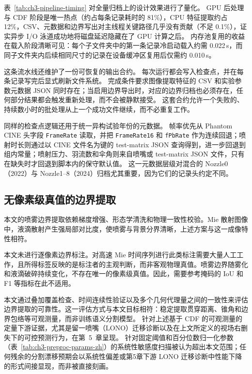 表~\ref{tab:ch3-pipeline-timing} 对全量归档上的设计效果进行了量化。
GPU 后处理与 CDF 阶段是唯一热点（约占每条记录耗时的 81\%），CPU 特征提取约占 12\%，CSV、元数据和边界写出对主线程关键路径几乎没有贡献（不足 0.1\%），证实异步 I/O 泳道成功地将磁盘延迟隐藏在了 GPU 计算之后。
内存池复用的收益在载入阶段清晰可见：每个子文件夹中的第一条记录冷启动载入约需 0.022\,s，而同子文件夹内后续相同尺寸的记录在设备缓冲区复用后仅需约 0.010\,s。

这条流水线还维护了一份可恢复的输出合约。
每次运行都会写入检查点，并在每条记录写完后显式刷新文件系统。
完成条件要求图像提取特征的 CSV 和实验参数元数据 JSON 同时存在；当启用边界导出时，对应的边界归档也必须存在，任何部分结果都会触发重新处理，而不会被静默接受。
这套合约允许一个失败的、持续数小时的批处理从上一个成功文件继续，而不必重复工作。

同样的检查点逻辑还用于统一异构试验年份的元数据。
帧率优先从 Phantom CINE 头字段 \texttt{FrameRate} 读取，并把 \texttt{FrameRate16} 和 \texttt{fPbRate} 作为连续回退；喷射时长则通过以 CINE 文件名为键的 test-matrix JSON 查询得到，进一步回退到组内常量；喷射压力、羽流数和伞角则来自喷嘴或 test-matrix JSON 文件，只有在缺失时才回退到脚本内的保守默认值。
这一元数据层级对混合的 Nozzle0（2022）与 Nozzle1--8（2024）归档尤其重要，因为它们的记录头约定不同。




\subsection{无像素级真值的边界提取}

本文的喷雾边界提取依赖梯度增强、形态学清洗和物理一致性校验。Mie 散射图像中，液滴散射产生强局部对比度，使喷雾与背景分界清晰，上述方案与这一成像特性相符。

本文未进行逐像素边界标注。对高速 Mie 时间序列进行此类标注需要大量人工工作，且所得标签反映的是标注者的主观判断，而非客观物理真值。喷雾边界随雾化和液滴破碎持续变化，不存在唯一的像素级真值。因此，需要参考掩码的 IoU 和 F1 等指标在此不适用。

本文通过叠加覆盖检查、时间连续性验证以及多个几何代理量之间的一致性来评估边界提取的可靠性。这一评估方式与本文目标相符：稳定提取贯穿距离、锥角和边界包络等可观测量，而非训练语义分割模型。
针对上述基于 CDF 的可观测量的定量下游证据，尤其是留一喷嘴（LONO）迁移诊断以及在上文所定义的视场右删失下的可控预测行为，在第~5~章呈现。
针对固定阈值和百分位数归一化参数（表~\ref{tab:ch3-preproc-params-zh}）的系统性敏感度扫描被认为超出本文范围；任何残余的分割漂移预期会以系统性偏差或第5章下游 LONO 迁移诊断中性能下降的形式间接显现，而非被直接刻画。

